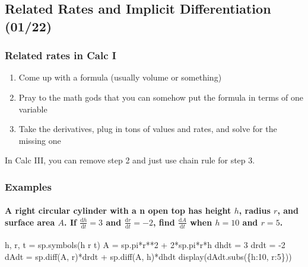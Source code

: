 \documentclass[
  letterpaper,
  DIV=11,
  numbers=noendperiod]{scrartcl}
\let\oldparagraph\paragraph
\renewcommand{\paragraph}[1]{\oldparagraph{#1}\mbox{}}
\newenvironment{Shaded}{\begin{snugshade}}{\end{snugshade}}
\newcommand{\NormalTok}[1]{\textcolor[rgb]{0.00,0.23,0.31}{#1}}
\providecommand{\tightlist}{%
  \setlength{\itemsep}{0pt}\setlength{\parskip}{0pt}}\usepackage{longtable,booktabs,array}
\begin{document}
\subsection{Related Rates and Implicit Differentiation
(01/22)}\label{related-rates-and-implicit-differentiation-0122}

\subsubsection{Related rates in Calc I}\label{related-rates-in-calc-i}

\begin{enumerate}
\def\labelenumi{\arabic{enumi})}
\tightlist
\item
  Come up with a formula (usually volume or something)
\item
  Pray to the math gods that you can somehow put the formula in terms of
  one variable
\item
  Take the derivatives, plug in tons of values and rates, and solve for
  the missing one
\end{enumerate}

In Calc III, you can remove step 2 and just use chain rule for step 3.

\subsubsection{Examples}\label{examples-9}

\paragraph{\texorpdfstring{A right circular cylinder with a n open top
has height \(h\), radius \(r\), and surface area \(A\). If
\(\frac{\mathrm{d}h}{\mathrm{d}t} = 3\) and
\(\frac{\mathrm{d}r}{\mathrm{d}t} = -2\), find
\(\frac{\mathrm{d}A}{\mathrm{d}t}\) when \(h=10\) and
\(r=5\).}{A right circular cylinder with a n open top has height h, radius r, and surface area A. If \textbackslash frac\{\textbackslash mathrm\{d\}h\}\{\textbackslash mathrm\{d\}t\} = 3 and \textbackslash frac\{\textbackslash mathrm\{d\}r\}\{\textbackslash mathrm\{d\}t\} = -2, find \textbackslash frac\{\textbackslash mathrm\{d\}A\}\{\textbackslash mathrm\{d\}t\} when h=10 and r=5.}}\label{a-right-circular-cylinder-with-a-n-open-top-has-height-h-radius-r-and-surface-area-a.-if-fracmathrmdhmathrmdt-3-and-fracmathrmdrmathrmdt--2-find-fracmathrmdamathrmdt-when-h10-and-r5.}

\begin{Shaded}
\begin{Highlighting}[numbers=left,,]
\NormalTok{h, r, t = sp.symbols(\textquotesingle{}h r t\textquotesingle{})}
\NormalTok{A = sp.pi*r**2 + 2*sp.pi*r*h}
\NormalTok{dhdt = 3}
\NormalTok{drdt = {-}2}
\NormalTok{dAdt = sp.diff(A, r)*drdt + sp.diff(A, h)*dhdt}
\NormalTok{display(dAdt.subs(\{h:10, r:5\}))}
\end{Highlighting}
\end{Shaded}
\end{document}
